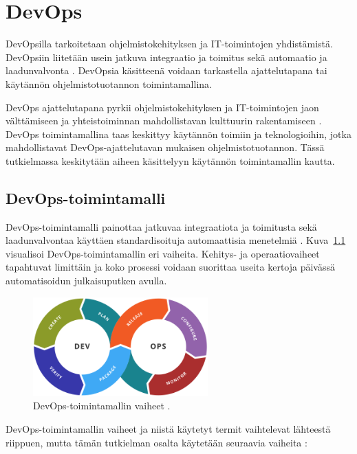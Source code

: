 \chapter{DevOps\label{devops}}

DevOpsilla tarkoitetaan ohjelmistokehityksen ja IT-toimintojen yhdistämistä.
DevOpsiin liitetään usein jatkuva integraatio ja toimitus sekä automaatio ja laadunvalvonta \cite{Jabbari16, Leite19}.
DevOpsia käsitteenä voidaan tarkastella ajattelutapana tai käytännön ohjelmistotuotannon toimintamallina.

DevOps ajattelutapana pyrkii ohjelmistokehityksen ja IT-toimintojen jaon välttämiseen ja yhteistoiminnan mahdollistavan kulttuurin rakentamiseen \cite{Klein21}.
DevOps toimintamallina taas keskittyy käytännön toimiin ja teknologioihin, jotka mahdollistavat DevOps-ajattelutavan mukaisen ohjelmistotuotannon.
Tässä tutkielmassa keskitytään aiheen käsittelyyn käytännön toimintamallin kautta.

\section{DevOps-toimintamalli}

DevOps-toimintamalli painottaa jatkuvaa integraatiota ja toimitusta sekä laadunvalvontaa käyttäen standardisoituja automaattisia menetelmiä \cite{Leite19}.
Kuva~\ref{fig:devops} visualisoi DevOps-toimintamallin eri vaiheita.
Kehitys- ja operaatiovaiheet tapahtuvat limittäin ja koko prosessi voidaan suorittaa useita kertoja päivässä automatisoidun julkaisuputken avulla.

\begin{figure}[ht]
\begin{center}
\includegraphics[width=0.6\textwidth]{figures/devops_toolchain.png}
\caption{DevOps-toimintamallin vaiheet \cite{Wikimedia23}\label{fig:devops}.}
\end{center}
\end{figure}

DevOps-toimintamallin vaiheet ja niistä käytetyt termit vaihtelevat lähteestä riippuen, mutta tämän tutkielman osalta käytetään seuraavia vaiheita \cite{Alnafessah21}:

